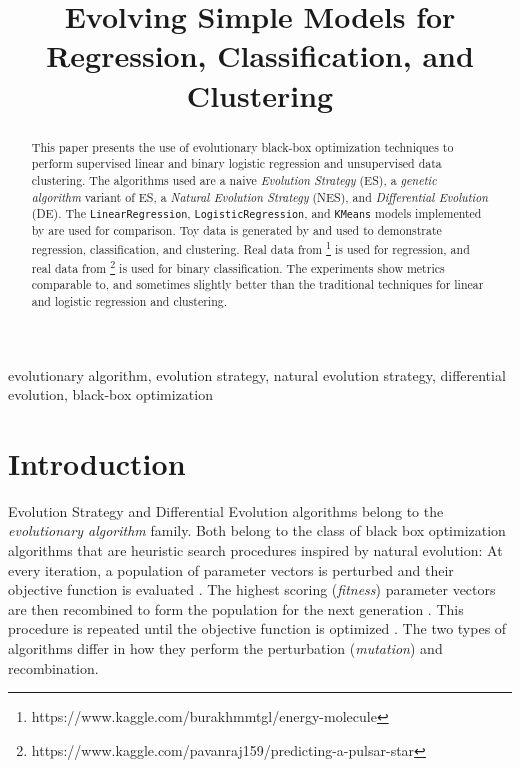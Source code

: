 \documentclass[conference]{IEEEtran}
\begin{document}
\title{Evolving Simple Models for Regression, Classification, and Clustering}

\author{
}

\maketitle

\begin{abstract}
This paper presents the use of evolutionary black-box optimization techniques to perform supervised linear and binary logistic regression 
and unsupervised data clustering. The algorithms used are a naive \emph{Evolution Strategy} (ES), a \emph{genetic algorithm} variant of ES, 
a \emph{Natural Evolution Strategy} (NES), and \emph{Differential Evolution} (DE). The \texttt{LinearRegression}, \texttt{LogisticRegression}, 
and \texttt{KMeans} models implemented by \cite{scikit} are used for comparison. Toy data is generated by \cite{scikit} and used to demonstrate 
regression, classification, and clustering. Real data from \cite{molecules}\footnote{https://www.kaggle.com/burakhmmtgl/energy-molecule} is used 
for regression, and real data from \cite{pulsar}\footnote{https://www.kaggle.com/pavanraj159/predicting-a-pulsar-star} is used for binary 
classification. The experiments show metrics comparable to, and sometimes slightly better than the traditional techniques for linear and logistic 
regression and clustering.
\end{abstract}

\begin{IEEEkeywords}
evolutionary algorithm, evolution strategy, natural evolution strategy, differential evolution, black-box optimization
\end{IEEEkeywords}

\section{Introduction}
Evolution Strategy and Differential Evolution algorithms belong to the \emph{evolutionary algorithm} family. Both belong to the class of black 
box optimization algorithms that are heuristic search procedures inspired by natural evolution: At every iteration, a population of 
parameter vectors is perturbed and their objective function is evaluated \cite{openai}. The highest scoring (\emph{fitness}) parameter vectors are then 
recombined to form the population for the next generation \cite{openai}. This procedure is repeated until the objective function is 
optimized \cite{openai}. The two types of algorithms differ in how they perform the perturbation (\emph{mutation}) and recombination.
\end{document}

